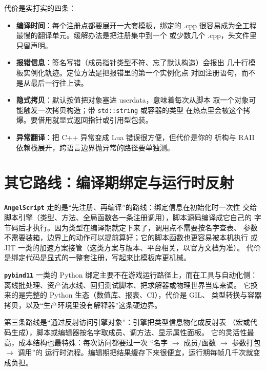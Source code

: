 \documentclass[12pt,a4paper,fontset=fandol]{ctexbook}
\newcommand{\Tp}[1]{\texttt{#1}}
\newcommand{\Lib}[1]{\textbf{\texttt{#1}}}
\newcommand{\Lang}[1]{\textsf{#1}}
\newcommand{\PY}{\Lang{Python}}
\begin{document}
代价是实打实的四条：

\begin{itemize}
  \item \textbf{编译时间}：每个注册点都要展开一大套模板，绑定的 .cpp
        很容易成为全工程最慢的翻译单元。缓解办法是把注册集中到一个
        或少数几个 .cpp，头文件里只留声明。
  \item \textbf{报错信息}：签名写错（成员指针类型不符、忘了默认构造）会报出
        几十行模板实例化轨迹。定位方法是把报错里的第一个实例化点
        对回注册语句，而不是从最后一行往上读。
  \item \textbf{隐式拷贝}：默认按值把对象塞进 userdata，意味着每次从脚本
        取一个对象可能触发一次拷贝构造；带 \Tp{std::string} 或容器的类型
        在热点里会被这个拷爆。要借用就显式返回指针或引用型包装。
  \item \textbf{异常翻译}：把 C++ 异常变成 Lua 错误很方便，但代价是你的
        析构与 RAII 依赖栈展开，跨语言边界抛异常的路径要单独测。
\end{itemize}

\section{其它路线：编译期绑定与运行时反射}
\label{sec:ch14-other-routes}

\Lib{AngelScript} 走的是``先注册、再编译''的路线：绑定信息在初始化时一次性
交给脚本引擎（类型、方法、全局函数各一条注册调用），脚本源码编译成它自己的
字节码后才执行。因为类型在编译期就定下来了，调用点不需要按名字查表、
参数不需要装箱，边界上的动作可以提前算好；它的脚本函数也更容易被本机执行
或 JIT 一类的加速方案接管（这类方案与版本、平台相关，以官方文档为准）。
代价是绑定代码是显式的一整套注册，写起来比模板库更机械。

\Lib{pybind11} 一类的 \PY{} 绑定主要不在游戏运行路径上，而在工具与自动化侧：
离线批处理、资产流水线、回归测试脚本、把求解器或物理世界当库来调。
它换来的是完整的 \PY{} 生态（数值库、报表、CI），代价是 GIL、
类型转换与容器拷贝，以及``生产环境里没有解释器''这条硬边界。

第三条路线是``通过反射访问引擎对象''：引擎把类型信息物化成反射表
（宏或代码生成），脚本或编辑器按名字取成员、调方法、显示属性面板。
它的灵活性最高，成本结构也最特殊：每次访问都要过一次
``名字 $\rightarrow$ 成员/函数 $\rightarrow$ 参数打包 $\rightarrow$ 调用''的
运行时流程。编辑期把结果缓存下来很便宜，运行期每帧几千次就变成负担。
\end{document}
